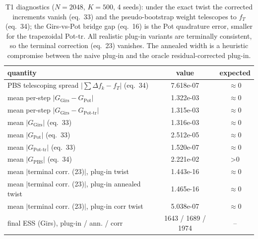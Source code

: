 \begin{table}[ht]
\centering
\caption{T1 diagnostics ($N=2048$, $K=500$, 4 seeds): under the exact twist the corrected increments vanish (eq.~33) and the pseudo-bootstrap weight telescopes to $f_T$ (eq.~34); the Girs-vs-Pot bridge gap (eq.~16) is the Pot quadrature error, smaller for the trapezoidal Pot-tr.  All realistic plug-in variants are terminally consistent, so the terminal correction (eq.~23) vanishes.  The annealed width is a heuristic compromise between the naive plug-in and the oracle residual-corrected plug-in.}
\label{tab:toy_t1_diag}
\begin{tabular}{lcc}
\toprule
quantity & value & expected \\
\midrule
PBS telescoping spread $|\sum\Delta f_k - f_T|$ (eq.~34) & 7.618e-07 & $\approx 0$ \\
mean per-step $|G_{\mathrm{Girs}} - G_{\mathrm{Pot}}|$ & 1.322e-03 & $\approx 0$ \\
mean per-step $|G_{\mathrm{Girs}} - G_{\mathrm{Pot\text{-}tr}}|$ & 1.315e-03 & $\approx 0$ \\
mean $|G_{\mathrm{Girs}}|$ (eq.~33) & 1.316e-03 & $\approx 0$ \\
mean $|G_{\mathrm{Pot}}|$ (eq.~33) & 2.512e-05 & $\approx 0$ \\
mean $|G_{\mathrm{Pot\text{-}tr}}|$ (eq.~33) & 1.520e-07 & $\approx 0$ \\
mean $|G_{\mathrm{PBS}}|$ (eq.~34) & 2.221e-02 & >$0$ \\
mean $|$terminal corr. (23)$|$, plug-in twist & 1.443e-16 & $\approx 0$ \\
mean $|$terminal corr. (23)$|$, plug-in annealed twist & 1.465e-16 & $\approx 0$ \\
mean $|$terminal corr. (23)$|$, plug-in corr twist & 5.038e-07 & $\approx 0$ \\
final ESS (Girs), plug-in / ann. / corr & 1643 / 1689 / 1974 & -- \\
\bottomrule
\end{tabular}
\end{table}
